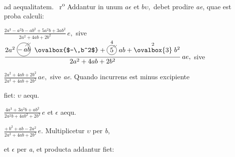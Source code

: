%
%
ad \lbrack aequalitatem\rbrack.%
%
%
~r\textsuperscript{o}\rbrack%
%
\pend%
%
\pstart%
Addantur in unum $a\epsilon$ et $b\upsilon,$%
debet prodire \textit{ae},
quae est proba calculi:%
\protect{}%
\protect{}
\newline%
\rule[-4mm]{0pt}{12mm}%
$\displaystyle\frac{2a^3-a^2b-ab^2+5a^2b+3ab^2}{2a^2+4ab+2b^2}\,e,$
sive
$\displaystyle\frac{%
2a^2 \raisebox{-2.2mm}
{\begin{tikzpicture} \draw (0,0) circle (0.35cm) node at (0,0) {$-\,ab$}; \draw (.18,.18) -- (.35,.35); \draw (.075,.175) -- (.25,.35); \end{tikzpicture}}\;
\ovalbox{$-\,b^2$} + 
\overset{4}{\raisebox{-1.5mm}{\begin{tikzpicture} \draw (0,0) circle (0.25cm) node at (0,0) {5}; \draw (.13,.13) -- (.26,.26); \draw (.05,.15) -- (.16,.26); \end{tikzpicture}}}\;ab + 
\overset{2}{\ovalbox{3}}\;b^2%
}{2a^2+4ab+2b^2}\,ae,$
\newline%
sive
\rule[-3mm]{0pt}{7mm}%
$\displaystyle\frac{2a^2+4ab+2b^2}{2a^2+4ab+2b^2}\,ae,$
sive \textit{ae}.
\pend%
%
\pstart%
Quando incurrens%
\protect{}
est minus excipiente%
\protect{}
\rule[-2mm]{0pt}{6mm}%
fiet:
\newline%
$\upsilon$ aequ.
\rule[-2mm]{0pt}{5mm}%
$\displaystyle\frac{4a^3 + 3a^2b + ab^2}{2a^2b + 4ab^2 + 2b^3}\,e$
et $\epsilon$ aequ.
\rule[-2mm]{0pt}{5mm}%
$\displaystyle\frac{+\,b^2 + ab - 2a^2}{2a^2 + 4ab + 2b^2}\,e.$
\pend%
%
\pstart%
Multiplicetur $\upsilon$ per \textit{b},
\rule[-0mm]{0pt}{5mm}%
et $\epsilon$ per \textit{a},
et producta addantur
fiet:
\newline%
